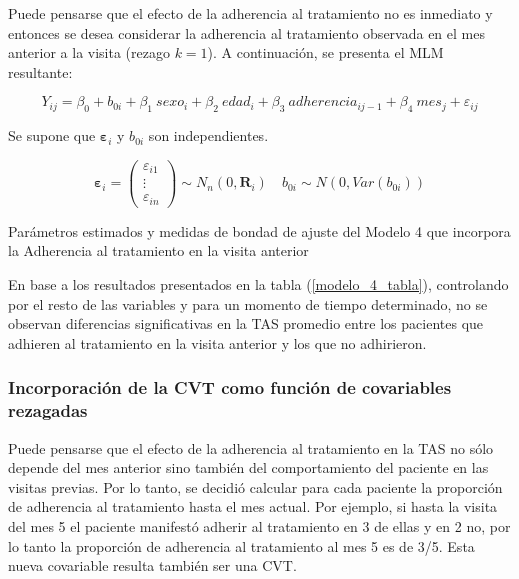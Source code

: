 \documentclass[spanish]{article}
\numberwithin{figure}{subsection}
\numberwithin{equation}{subsection}
\numberwithin{table}{subsection}
\begin{document}
Puede pensarse que el efecto de la adherencia al tratamiento no es inmediato y
entonces se desea considerar la adherencia al tratamiento observada en el mes
anterior a la visita (rezago $k=1$). A continuación, se presenta el MLM
resultante:

\begin{equation}
	\label{modelo_4}
	Y_{ij} = \beta_0 + b_{0i} + \beta_1\ sexo_i + \beta_2\ edad_i + \beta_3\ adherencia_{ij-1}
	+ \beta_4\ mes_j + \varepsilon_{ij}
\end{equation}

Se supone que $\bm{\varepsilon}_i$ y $b_{0i}$ son independientes.

\[ 
	\bm{\varepsilon}_i = \begin{pmatrix} \varepsilon_{i1} \\ \vdots \\ \varepsilon_{in} \end{pmatrix} \sim N_{n}(0, \bm{R}_i)
	\quad
	b_{0i} \sim N(0, Var(b_{0i}))
\]

\begin{table}[H]
	\centering
	\caption{Parámetros estimados y medidas de bondad de ajuste del Modelo 4 que incorpora la Adherencia al tratamiento en la visita anterior}
	\label{modelo_4_tabla}
	
\end{table}

En base a los resultados presentados en la tabla (\ref{modelo_4_tabla}),
controlando por el resto de las variables y para un momento de tiempo
determinado, no se observan diferencias significativas en la TAS promedio entre
los pacientes que adhieren al tratamiento en la visita anterior y los que no
adhirieron.

\subsubsection{Incorporación de la CVT como función de covariables rezagadas}

Puede pensarse que el efecto de la adherencia al tratamiento en la TAS no sólo
depende del mes anterior sino también del comportamiento del paciente en las
visitas previas. Por lo tanto, se decidió calcular para cada paciente la
proporción de adherencia al tratamiento hasta el mes actual. Por ejemplo, si
hasta la visita del mes 5 el paciente manifestó adherir al tratamiento en 3 de
ellas y en 2 no, por lo tanto la proporción de adherencia al tratamiento al mes
5 es de 3/5. Esta nueva covariable resulta también ser una CVT.
\end{document}
